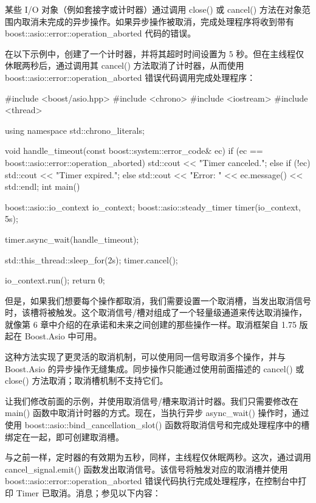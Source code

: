 
某些 I/O 对象（例如套接字或计时器）通过调用 close() 或 cancel() 方法在对象范围内取消未完成的异步操作。如果异步操作被取消，完成处理程序将收到带有 boost::asio::error::operation\_aborted 代码的错误。

在以下示例中，创建了一个计时器，并将其超时时间设置为 5 秒。但在主线程仅休眠两秒后，通过调用其 cancel() 方法取消了计时器，从而使用 boost::asio::error::operation\_aborted 错误代码调用完成处理程序：

\begin{cpp}
#include <boost/asio.hpp>
#include <chrono>
#include <iostream>
#include <thread>

using namespace std::chrono_literals;

void handle_timeout(const boost::system::error_code& ec) {
    if (ec == boost::asio::error::operation_aborted) {
        std::cout << "Timer canceled.\n";
    } else if (!ec) {
        std::cout << "Timer expired.\n";
    } else {
        std::cout << "Error: " << ec.message()
                  << std::endl;
    }
}
int main() {
    boost::asio::io_context io_context;
    boost::asio::steady_timer timer(io_context, 5s);

    timer.async_wait(handle_timeout);

    std::this_thread::sleep_for(2s);
    timer.cancel();

    io_context.run();
    return 0;
}
\end{cpp}

但是，如果我们想要每个操作都取消，我们需要设置一个取消槽，当发出取消信号时，该槽将被触发。这个取消信号/槽对组成了一个轻量级通道来传达取消操作，就像第 6 章中介绍的在承诺和未来之间创建的那些操作一样。取消框架自 1.75 版起在 Boost.Asio 中可用。

这种方法实现了更灵活的取消机制，可以使用同一信号取消多个操作，并与 Boost.Asio 的异步操作无缝集成。同步操作只能通过使用前面描述的 cancel() 或 close() 方法取消；取消槽机制不支持它们。

让我们修改前面的示例，并使用取消信号/槽来取消计时器。我们只需要修改在 main() 函数中取消计时器的方式。现在，当执行异步 async\_wait() 操作时，通过使用 boost::asio::bind\_cancellation\_slot() 函数将取消信号和完成处理程序中的槽绑定在一起，即可创建取消槽。

与之前一样，定时器的有效期为五秒，同样，主线程仅休眠两秒。这次，通过调用 cancel\_signal.emit() 函数发出取消信号。该信号将触发对应的取消槽并使用 boost::asio::error::operation\_aborted 错误代码执行完成处理程序，在控制台中打印 Timer 已取消。消息；参见以下内容：

